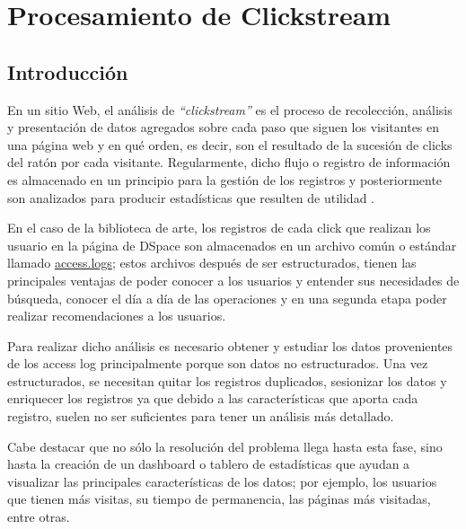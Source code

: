 
\chapter{Procesamiento de Clickstream}
\label{logs}


\section{Introducción}

En un sitio Web, el análisis de \emph{``clickstream''} es el proceso de
recolección, análisis y presentación de datos agregados sobre cada paso
que siguen los visitantes en una página web y en qué orden, es decir,
son el resultado de la sucesión de clicks del ratón por cada visitante.
Regularmente, dicho flujo o registro de información es almacenado en un
principio para la gestión de los registros y posteriormente son
analizados para producir estadísticas que resulten de utilidad \citep{lagus2000text}.


En el caso de la biblioteca de arte, los registros de cada click que realizan los usuario en la página de DSpace son almacenados en un archivo común o estándar llamado  \href{https://httpd.apache.org/docs/2.2/logs.html}{access.logs}; estos archivos después de ser estructurados, tienen las principales ventajas de poder conocer a los usuarios y entender sus necesidades de búsqueda, conocer el día a día de las operaciones y en una segunda etapa poder realizar recomendaciones a los usuarios\citep{banerjee2002characterizing}.

Para realizar dicho análisis es necesario obtener y estudiar los datos provenientes de los access log\citep{apache} principalmente porque son datos no estructurados. Una vez estructurados, se necesitan quitar los registros duplicados, sesionizar los datos y enriquecer los registros ya que debido a las características que aporta cada registro, suelen no ser suficientes para tener un análisis más detallado.

Cabe destacar que no sólo la resolución del problema llega hasta esta fase, sino hasta la creación de un dashboard o tablero de estadísticas que ayudan a visualizar las principales características de los datos; por ejemplo, los usuarios que tienen más visitas, su tiempo de permanencia, las páginas más visitadas, entre otras.


